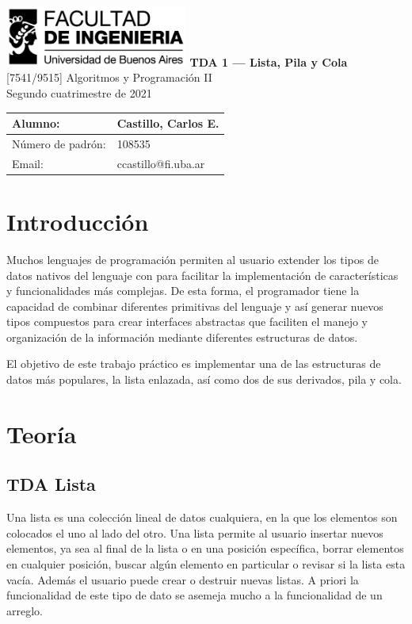 \documentclass[titlepage,a4paper]{article}
\makeatletter
\newcommand{\FirstName}{Carlos E.}
\newcommand{\LastName}{Castillo}
\newcommand{\StudentID}{108535}
\newcommand{\StudentEmail}{ccastillo@fi.uba.ar}
\newcommand{\ProjectName}{TDA 1 — Lista, Pila y Cola}
\makeatother
\begin{document}
\begin{titlepage}
	\hfill\includegraphics[width=6cm]{logofiuba.jpg}
    \centering
    \vfill
    \Huge \textbf{\ProjectName}
    \vskip2cm
    \Large [7541/9515] Algoritmos y Programación II\\
    Segundo cuatrimestre de 2021 
    \vfill
    \begin{tabular}{ | l | l | }
      \hline
      Alumno: & \LastName, \FirstName \\ \hline
      Número de padrón: & \StudentID \\ \hline
      Email: & \StudentEmail \\ \hline
  	\end{tabular}
    \vfill
    \vfill
\end{titlepage}

\tableofcontents
\newpage

\section{Introducción}\label{sec:intro}

Muchos lenguajes de programación permiten al usuario extender los tipos de datos nativos del lenguaje con para facilitar la implementación de características y funcionalidades más complejas. 
De esta forma, el programador tiene la capacidad de combinar diferentes primitivas del lenguaje y así generar nuevos tipos compuestos para crear interfaces abstractas que faciliten el manejo y organización de la información mediante diferentes estructuras de datos.

El objetivo de este trabajo práctico es implementar una de las estructuras de datos más populares, la lista enlazada, así como dos de sus derivados, pila y cola.

\section{Teoría}\label{sec:teoria}

\subsection{TDA Lista}

Una lista es una colección lineal de datos cualquiera, en la que los elementos son colocados el uno al lado del otro. Una lista permite al usuario insertar nuevos elementos, ya sea al final de la lista o en una posición específica, borrar elementos en cualquier posición, buscar algún elemento en particular o revisar si la lista esta vacía. Además el usuario puede crear o destruir nuevas listas. A priori la funcionalidad de este tipo de dato se asemeja mucho a la funcionalidad de un arreglo.
\end{document}
